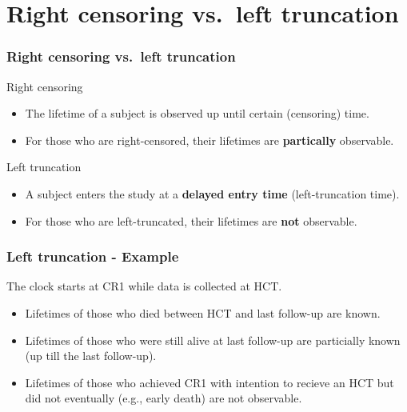 \documentclass[11pt, aspectratio = 169]{beamer}
\begin{document}
\section{Right censoring vs.\ left truncation}

\begin{frame}
  \frametitle{Right censoring vs.\ left truncation}
  \begin{block}{Right censoring}
    \begin{itemize}
      \item The lifetime of a subject is observed up until certain (censoring) time.
      \item For those who are right-censored, their lifetimes are \textbf{partically} observable.
    \end{itemize}
  \end{block}
  \begin{block}{Left truncation}
    \begin{itemize}
      \item A subject enters the study at a \textbf{delayed entry time} (left-truncation time).
      \item For those who are left-truncated, their lifetimes are \textbf{not} observable.
    \end{itemize}
  \end{block}
\end{frame}

\begin{frame}
  \frametitle{Left truncation - Example}
  \begin{figure}
    \centering
  \end{figure}
  The clock starts at CR1 while data is collected at HCT.
  \begin{itemize}
    \item Lifetimes of those who died between HCT and last follow-up are known.
    \item Lifetimes of those who were still alive at last follow-up are particially known (up till the last follow-up).
    \item Lifetimes of those who achieved CR1 with intention to recieve an HCT but did not eventually (e.g., early death) are not observable.
  \end{itemize}
\end{frame}
\end{document}
